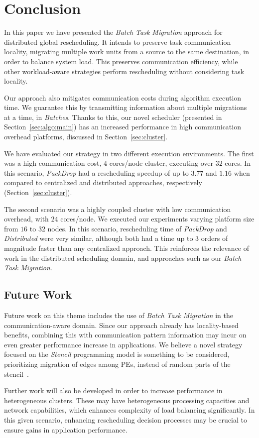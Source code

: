 \section{Conclusion} \label{sec:conclusion}

In this paper we have presented the \textit{Batch Task Migration} approach for distributed global rescheduling.
It intends to preserve task communication locality, migrating multiple work units from a source to the same destination, in order to balance system load.
This preserves communication efficiency, while other workload-aware strategies perform rescheduling without considering task locality.

Our approach also mitigates communication costs during algorithm execution time.
We guarantee this by transmitting information about multiple migrations at a time, in \textit{Batches}.
Thanks to this, our novel scheduler (presented in Section~\ref{sec:algo:main}) has an increased performance in high communication overhead platforms, discussed in Section~\ref{sec:cluster}.

We have evaluated our strategy in two different execution environments. 
The first was a high communication cost, $4$ cores/node cluster, executing over $32$ cores.
In this scenario, \textit{PackDrop} had a rescheduling speedup of up to $3.77$ and $1.16$ when compared to centralized and distributed approaches, respectively (Section~\ref{sec:cluster}).

The second scenario was a highly coupled cluster with low communication overhead, with $24$ cores/node.
We executed our experiments varying platform size from $16$ to $32$ nodes.
In this scenario, rescheduling time of \textit{PackDrop} and \textit{Distributed} were very similar, although both had a time up to $3$ orders of magnitude faster than any centralized approach. %
This reinforces the relevance of work in the distributed scheduling domain, and approaches such as our \textit{Batch Task Migration}.

\subsection{Future Work}

Future work on this theme includes the use of \textit{Batch Task Migration} in the communication-aware domain.
Since our approach already has locality-based benefits, combining this with communication pattern information may incur on even greater performance increase in applications.
We believe a novel strategy focused on the \textit{Stencil} programming model is something to be considered, prioritizing migration of edges among PEs, instead of random parts of the stencil~\cite{stenciltiling}.

Further work will also be developed in order to increase performance in heterogeneous clusters.
These may have heterogeneous processing capacities and network capabilities, which enhances complexity of load balancing significantly.
In this given scenario, enhancing rescheduling decision processes may be crucial to ensure gains in application performance.